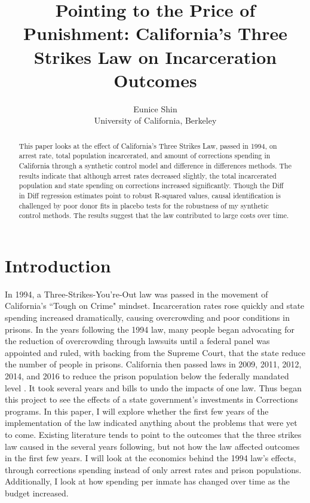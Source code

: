 \documentclass[12pt]{article}
\title{Pointing to the Price of Punishment: California's Three Strikes Law on Incarceration Outcomes}
\author{Eunice Shin \\ University of California, Berkeley}
\begin{document}
\maketitle

\thispagestyle{empty}

\maketitle

\thispagestyle{empty}

\begin{abstract}
\noindent This paper looks at the effect of California’s Three Strikes Law, passed in 1994, on arrest rate, total population incarcerated, and amount of corrections spending in California through a synthetic control model and difference in differences methods. The results indicate that although arrest rates decreased slightly, the total incarcerated population and state spending on corrections increased significantly. Though the Diff in Diff regression estimates point to robust R-squared values, causal identification is challenged by poor donor fits in placebo tests for the robustness of my synthetic control methods. The results suggest that the law contributed to large costs over time.

\end{abstract}


\newpage


\section{Introduction}
    In 1994, a Three-Strikes-You're-Out law was passed in the movement of California's ``Tough on Crime" mindset. Incarceration rates rose quickly and state spending increased dramatically, causing overcrowding and poor conditions in prisons. In the years following the 1994 law, many people began advocating for the reduction of overcrowding through lawsuits until a federal panel was appointed and ruled, with backing from the Supreme Court, that the state reduce the number of people in prisons. California then passed laws in 2009, 2011, 2012, 2014, and 2016 to reduce the prison population below the federally mandated level \parencite{PPIC_CriminalJusticeShifts}. It took several years and bills to undo the impacts of one law. Thus began this project to see the effects of a state government's investments in Corrections programs. In this paper, I will explore whether the first few years of the implementation of the law indicated anything about the problems that were yet to come. Existing literature tends to point to the outcomes that the three strikes law caused in the several years following, but not how the law affected outcomes in the first few years. I will look at the economics behind the 1994 law's effects, through corrections spending instead of only arrest rates and prison populations. Additionally, I look at how spending per inmate has changed over time as the budget increased.
    
\end{document}
